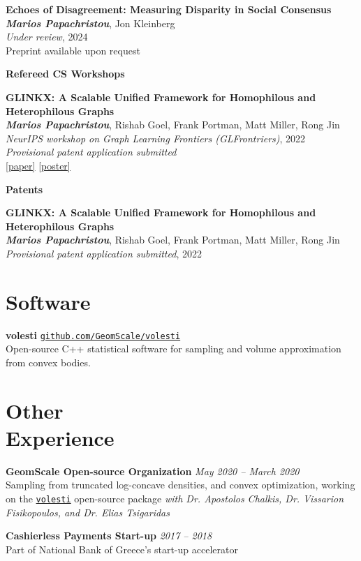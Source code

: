 \documentclass[margin]{res}
\newcommand{\field}[2]{\noindent \textbf{#1} \hfill #2 \\}
\newcommand{\specialurl}[2]{\href {#2} {{{[#1]}}}}
\newcommand{\poster}[1]{\specialurl {poster} {#1}}
\newcommand{\paper}[1]{\specialurl {paper} {#1}}
\newcommand{\authorref}[1]{{\textit{\textbf{#1}}}}
\newcommand{\authorme}{\authorref{Marios Papachristou}}
\newcommand{\publication}[5]{\textbf{#1}\\{#2}\\\emph{#3}, {#4}\\{#5}\smallskip}
\begin{document}
\begin{resume}
{\begin{enumerate}[nosep, label={[WP\arabic*]}]
   	\item \publication{Echoes of Disagreement: Measuring Disparity in Social Consensus}{\authorme, Jon Kleinberg}{Under review}{2024}{Preprint available upon request}
    \end{enumerate}}


\field{Refereed CS Workshops}{}{
\begin{enumerate}[nosep, label={[W\arabic*]}]  
	\item \publication{GLINKX: A Scalable Unified Framework for Homophilous and Heterophilous Graphs}{\authorme, Rishab Goel, Frank Portman, Matt Miller, Rong Jin}{NeurIPS workshop on Graph Learning Frontiers (GLFrontriers)}{2022}{\emph{Provisional patent application submitted} \\ \paper{https://openreview.net/forum?id=GlViaJSwnlK} \poster{https://drive.google.com/file/d/14LwkvoH7sUe6qGvINGqTuMSHid16J3Av/view?usp=share_link}}
\end{enumerate}}

\field{Patents}{}{
\begin{enumerate}[nosep, label={[P\arabic*]}]  
	\item \publication{GLINKX: A Scalable Unified Framework for Homophilous and Heterophilous Graphs}{\authorme, Rishab Goel, Frank Portman, Matt Miller, Rong Jin}{Provisional patent application submitted}{2022}{}
\end{enumerate}}

\section{Software} \field{volesti}{\href{https://github.com/GeomScale/volesti}{\texttt{github.com/GeomScale/volesti}}}{Open-source C++ statistical software for sampling and volume approximation from convex bodies.}



\section{Other \\ Experience}


\field{GeomScale Open-source Organization}{\emph{May 2020 -- March 2020}}{Sampling from truncated log-concave densities, and convex optimization, working on the \href{https://github.com/GeomScale/volesti}{\texttt{volesti}} open-source package \emph{with Dr. Apostolos Chalkis, Dr. Vissarion Fisikopoulos, and Dr. Elias Tsigaridas}}

\field{Cashierless Payments Start-up}{\emph{2017 -- 2018}}{Part of National Bank of Greece's start-up accelerator}


\end{resume}
\end{document}
